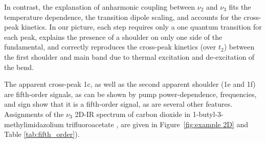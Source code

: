 \documentclass[%
  class = book,%
  crop = false,%
  float = true,%
  multi = true,%
  preview = false,%
]{standalone}
\begin{document}
{In contrast, the explanation of anharmonic coupling between \(\nu_2\) and \(\nu_3\) fits the temperature dependence, the transition dipole scaling, and accounts for the cross-peak kinetics. In our picture, each step requires only a one quantum transition for each peak, explains the presence of a shoulder on only one side of the fundamental, and correctly reproduces the cross-peak kinetics (over \(t_2\)) between the first shoulder and main band due to thermal excitation and de-excitation of the bend.

The apparent cross-peak 1c, as well as the second apparent shoulder (1e and 1f) are fifth-order signals, as can be shown by pump power-dependence, frequencies, and sign show that it is a fifth-order signal, as are several other features. Assignments of the \(\nu_3\) 2D-IR spectrum of carbon dioxide in 1-butyl-3-methylimidazolium trifluoroacetate \ce{[Im_{4,1}][TFA]}, are given in  Figure~\ref{fig:example 2D} and Table \ref{tab:fifth_order}).

}
\end{document}
